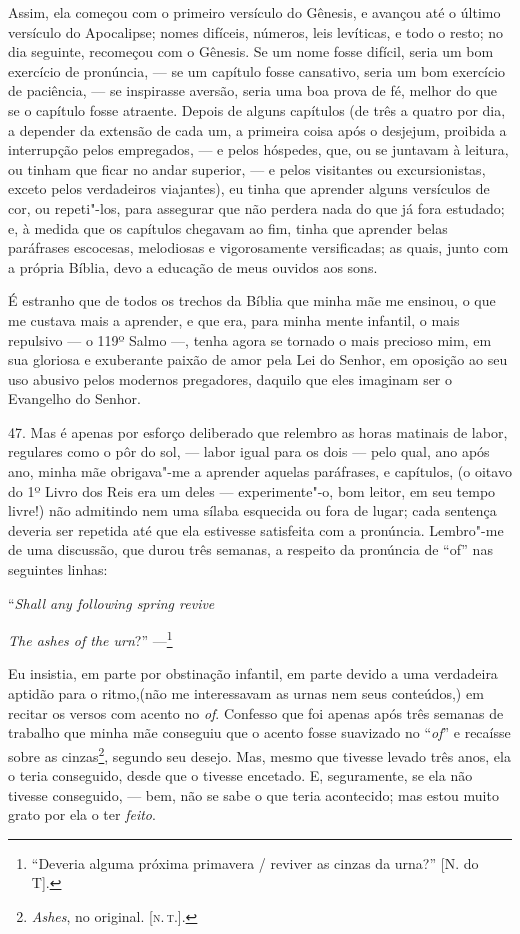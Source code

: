 Assim, ela começou com o primeiro versículo do Gênesis, e avançou até o
último versículo do Apocalipse; nomes difíceis, números, leis levíticas,
e todo o resto; no dia seguinte, recomeçou com o Gênesis. Se um nome
fosse difícil, seria um bom exercício de pronúncia, --- se um capítulo
fosse cansativo, seria um bom exercício de paciência, --- se inspirasse
aversão, seria uma boa prova de fé, melhor do que se o capítulo fosse
atraente. Depois de alguns capítulos (de três a quatro por dia, a
depender da extensão de cada um, a primeira coisa após o desjejum,
proibida a interrupção pelos empregados, --- e pelos hóspedes, que, ou se
juntavam à leitura, ou tinham que ficar no andar superior, --- e pelos
visitantes ou excursionistas, exceto pelos verdadeiros viajantes), eu
tinha que aprender alguns versículos de cor, ou repeti"-los, para
assegurar que não perdera nada do que já fora estudado; e, à medida que
os capítulos chegavam ao fim, tinha que aprender belas paráfrases
escocesas, melodiosas e vigorosamente versificadas; as quais, junto com
a própria Bíblia, devo a educação de meus ouvidos aos sons.

É estranho que de todos os trechos da Bíblia que minha mãe me ensinou, o
que me custava mais a aprender, e que era, para minha mente infantil, o
mais repulsivo --- o 119º Salmo ---, tenha agora se tornado o mais
precioso mim, em sua gloriosa e exuberante paixão de amor pela Lei do
Senhor, em oposição ao seu uso abusivo pelos modernos pregadores,
daquilo que eles imaginam ser o Evangelho do Senhor.

47. Mas é apenas por esforço deliberado que relembro as horas matinais
de labor, regulares como o pôr do sol, --- labor igual para os dois ---
pelo qual, ano após ano, minha mãe obrigava"-me a aprender aquelas
paráfrases, e capítulos, (o oitavo do 1º Livro dos Reis era um deles ---
experimente"-o, bom leitor, em seu tempo livre!) não admitindo nem uma
sílaba esquecida ou fora de lugar; cada sentença deveria ser repetida
até que ela estivesse satisfeita com a pronúncia. Lembro"-me de uma
discussão, que durou três semanas, a respeito da pronúncia de ``of'' nas
seguintes linhas:

``\emph{Shall any following spring revive}

\emph{The ashes of the urn}?'' ---\footnote{``Deveria alguma próxima
  primavera / reviver as cinzas da urna?'' {[}N. do T{]}.}

Eu insistia, em parte por obstinação infantil, em parte devido a uma
verdadeira aptidão para o ritmo,(não me interessavam as urnas nem seus
conteúdos,) em recitar os versos com acento no \emph{of}. Confesso que
foi apenas após três semanas de trabalho que minha mãe conseguiu que o
acento fosse suavizado no ``\emph{of}'' e recaísse sobre as
cinzas\footnote{\emph{Ashes}, no original. {[}\textsc{n.\,t.}{]}.}, segundo seu
desejo. Mas, mesmo que tivesse levado três anos, ela o teria conseguido,
desde que o tivesse encetado. E, seguramente, se ela não tivesse
conseguido, --- bem, não se sabe o que teria acontecido; mas estou muito
grato por ela o ter \emph{feito}.

